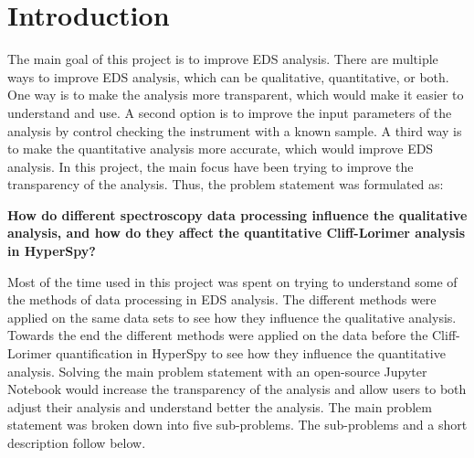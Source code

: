 \chapter{Introduction}
\label{chap:introduction}

%
%
The main goal of this project is to improve EDS analysis.
There are multiple ways to improve EDS analysis, which can be qualitative, quantitative, or both.
One way is to make the analysis more transparent, which would make it easier to understand and use.
A second option is to improve the input parameters of the analysis by control checking the instrument with a known sample.
A third way is to make the quantitative analysis more accurate, which would improve EDS analysis.
In this project, the main focus have been trying to improve the transparency of the analysis. Thus, the problem statement was formulated as:


\begin{mainprob}
    \label{mainproblem}
    \textbf{How do different spectroscopy data processing influence the qualitative analysis, and how do they affect the quantitative Cliff-Lorimer analysis in HyperSpy?}
\end{mainprob}

Most of the time used in this project was spent on trying to understand some of the methods of data processing in EDS analysis.
The different methods were applied on the same data sets to see how they  influence the qualitative analysis.
Towards the end the different methods were applied on the data before the Cliff-Lorimer quantification in HyperSpy to see how they influence the quantitative analysis.
Solving the main problem statement with an open-source Jupyter Notebook would increase the transparency of the analysis and allow users to both adjust their analysis and understand better the analysis.
The main problem statement was broken down into five sub-problems.
The sub-problems and a short description follow below.


